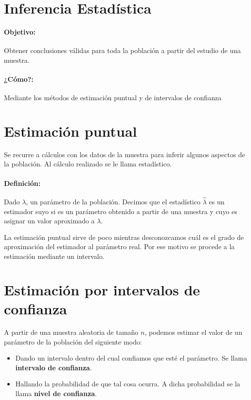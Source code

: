 \section{Inferencia Estadística}

\paragraph{Objetivo:} Obtener conclusiones válidas para toda la población a partir del estudio de una muestra.  

\paragraph{¿Cómo?:} Mediante los métodos de estimación puntual y de intervalos de confianza

\section{Estimación puntual} Se recurre a cálculos con los datos de la muestra para inferir algunos aspectos de la población. Al cálculo realizado se le llama estadístico.

\paragraph{Definición:} Dado $\lambda$, un parámetro de la población. Decimos que el estadístico $\widehat{\lambda}$
es un estimador suyo si es
un parámetro obtenido a partir de una muestra y cuyo es asignar un valor
aproximado a $\lambda$.

La estimación puntual sirve de poco mientras
desconozcamos cuál es el grado de aproximación del estimador al parámetro real. Por ese motivo se procede
a la estimación mediante un intervalo.

\section{Estimación por intervalos de confianza} 

 A partir de una muestra aleatoria de tamaño $n$, podemos estimar el valor de un parámetro de la población del siguiente modo:
 
\begin{itemize}
\item Dando un intervalo dentro del cual confiamos que esté el parámetro. Se llama \textbf{intervalo de confianza}.
\item Hallando la probabilidad de que tal cosa ocurra. A dicha probabilidad se la llama \textbf{nivel de confianza}.
\end{itemize}


